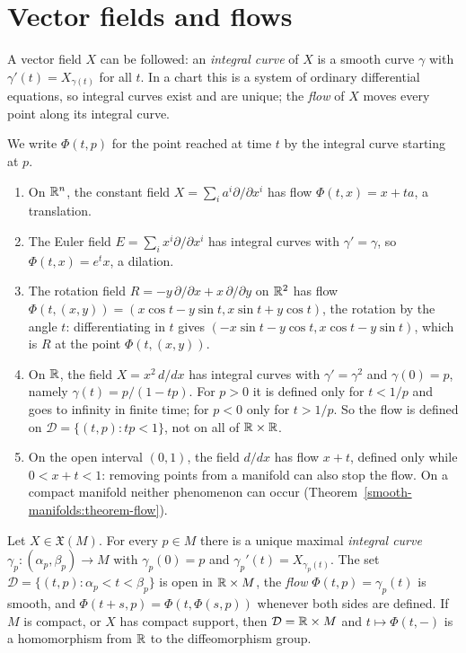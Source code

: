 \section{Vector fields and flows}\label{smooth-manifolds:section-flows}

A vector field $X$ can be followed: an \emph{integral curve} of $X$ is a smooth curve $\gamma$ with $\gamma'(t) = X_{\gamma(t)}$ for all $t$. In a chart this is
a system of ordinary differential equations, so integral curves exist and are unique; the \emph{flow} of $X$ moves every point along its integral curve.

\begin{example}\label{smooth-manifolds:example-flows}
We write $\Phi(t, p)$ for the point reached at time $t$ by the integral curve starting at $p$.
\begin{enumerate}
\item On $\mathbb{R}^n$, the constant field $X = \sum_ia^i\partial/\partial x^i$ has flow $\Phi(t, x) = x + ta$, a translation.
\item The Euler field $E = \sum_ix^i\partial/\partial x^i$ has integral curves with $\gamma' = \gamma$, so $\Phi(t, x) = e^tx$, a dilation.
\item The rotation field $R = -y\,\partial/\partial x + x\,\partial/\partial y$ on $\mathbb{R}^2$ has flow
$\Phi(t, (x, y)) = (x\cos t - y\sin t, x\sin t + y\cos t)$, the rotation by the angle $t$: differentiating in $t$ gives
$(-x\sin t - y\cos t, x\cos t - y\sin t)$, which is $R$ at the point $\Phi(t, (x, y))$.
\item On $\mathbb{R}$, the field $X = x^2\,d/dx$ has integral curves with $\gamma' = \gamma^2$ and $\gamma(0) = p$, namely $\gamma(t) = p/(1 - tp)$. For $p > 0$ it is
defined only for $t < 1/p$ and goes to infinity in finite time; for $p < 0$ only for $t > 1/p$. So the flow is defined on
$\mathcal{D} = \{(t, p) : tp < 1\}$, not on all of $\mathbb{R} \times \mathbb{R}$.
\item On the open interval $(0, 1)$, the field $d/dx$ has flow $x + t$, defined only while $0 < x + t < 1$: removing points from a manifold can also stop the
flow. On a compact manifold neither phenomenon can occur (Theorem~\ref{smooth-manifolds:theorem-flow}).
\end{enumerate}
\end{example}

\begin{theorem}\label{smooth-manifolds:theorem-flow}
Let $X \in \mathfrak{X}(M)$. For every $p \in M$ there is a unique maximal \emph{integral curve} $\gamma_p \colon (\alpha_p, \beta_p) \to M$ with $\gamma_p(0) = p$ and $\gamma_p'(t) = X_{\gamma_p(t)}$. The set
$\mathcal{D} = \{(t, p) : \alpha_p < t < \beta_p\}$ is open in $\mathbb{R} \times M$, the \emph{flow} $\Phi(t, p) = \gamma_p(t)$ is smooth, and $\Phi(t + s, p) = \Phi(t, \Phi(s, p))$ whenever both sides are defined. If
$M$ is compact, or $X$ has compact support, then $\mathcal{D} = \mathbb{R} \times M$ and $t \mapsto \Phi(t, -)$ is a homomorphism from $\mathbb{R}$ to the diffeomorphism group.
\end{theorem}

